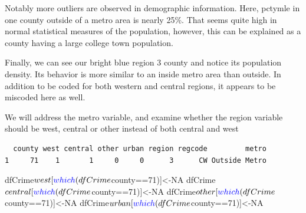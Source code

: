 \documentclass[]{article}
\newenvironment{Shaded}{}{}
\newcommand{\DecValTok}[1]{#1}
\newcommand{\KeywordTok}[1]{\textcolor[rgb]{0.00,0.00,1.00}{#1}}
\newcommand{\NormalTok}[1]{#1}
\newcommand{\OperatorTok}[1]{#1}
\newcommand{\OtherTok}[1]{\textcolor[rgb]{1.00,0.25,0.00}{#1}}
\newcommand{\StringTok}[1]{\textcolor[rgb]{0.00,0.50,0.50}{#1}}
\begin{document}
Notably more outliers are observed in demographic information. Here,
pctymle in one county outside of a metro area is nearly 25\%. That seems
quite high in normal statistical measures of the population, however,
this can be explained as a county having a large college town
population.

Finally, we can see our bright blue region 3 county and notice its
population density. Its behavior is more similar to an inside metro area
than outside. In addition to be coded for both western and central
regions, it appears to be miscoded here as well.

We will address the metro variable, and examine whether the region
variable should be west, central or other instead of both central and
west

\begin{Shaded}
\end{Shaded}

\begin{verbatim}
  county west central other urban region regcode         metro
1     71    1       1     0     0      3      CW Outside Metro
\end{verbatim}

\begin{Shaded}
\begin{Highlighting}[]
\NormalTok{dfCrime}\OperatorTok{$}\NormalTok{west[}\KeywordTok{which}\NormalTok{(dfCrime}\OperatorTok{$}\NormalTok{county}\OperatorTok{==}\DecValTok{71}\NormalTok{)]<-}\OtherTok{NA}
\NormalTok{dfCrime}\OperatorTok{$}\NormalTok{central[}\KeywordTok{which}\NormalTok{(dfCrime}\OperatorTok{$}\NormalTok{county}\OperatorTok{==}\DecValTok{71}\NormalTok{)]<-}\OtherTok{NA}
\NormalTok{dfCrime}\OperatorTok{$}\NormalTok{other[}\KeywordTok{which}\NormalTok{(dfCrime}\OperatorTok{$}\NormalTok{county}\OperatorTok{==}\DecValTok{71}\NormalTok{)]<-}\OtherTok{NA}
\NormalTok{dfCrime}\OperatorTok{$}\NormalTok{urban[}\KeywordTok{which}\NormalTok{(dfCrime}\OperatorTok{$}\NormalTok{county}\OperatorTok{==}\DecValTok{71}\NormalTok{)]<-}\OtherTok{NA}
\end{Highlighting}
\end{Shaded}
\end{document}
